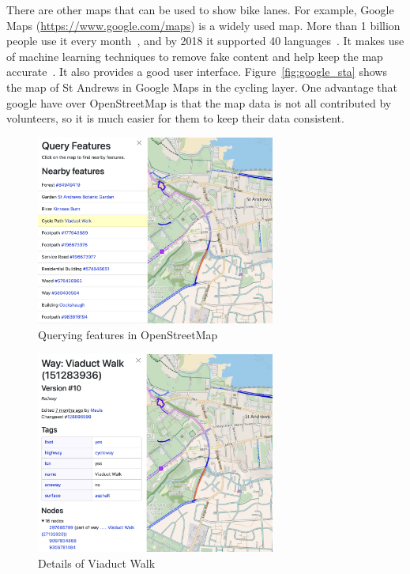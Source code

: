 \documentclass[12pt,a4paper]{report}
\begin{document}
There are other maps that can be used to show bike lanes. For example, Google Maps (\url{https://www.google.com/maps}) is a widely used map. More than 1 billion people use it every month~\cite{ethan2019}, and by 2018 it supported 40 languages~\cite{yamagami2018}. It makes use of machine learning techniques to remove fake content and help keep the map accurate~\cite{gupta2023}. It also provides a good user interface. Figure~\ref{fig:google_sta} shows the map of St Andrews in Google Maps in the cycling layer. One advantage that google have over OpenStreetMap is that the map data is not all contributed by volunteers, so it is much easier for them to keep their data consistent.

\begin{figure}[ht!]
    \centering
    \includegraphics[width=0.7\textwidth,trim={0 8cm 5cm 0},clip]{diss_images/context/feature.png}
    \caption{Querying features in OpenStreetMap}
    \label{fig:feature_query}
\end{figure}

\begin{figure}[ht!]
    \centering
    \includegraphics[width=0.7\textwidth,trim={0 5cm 5cm 0},clip]{diss_images/context/cycleway.png}
    \caption{Details of Viaduct Walk}
    \label{fig:cycleway_query}
\end{figure}
\end{document}
